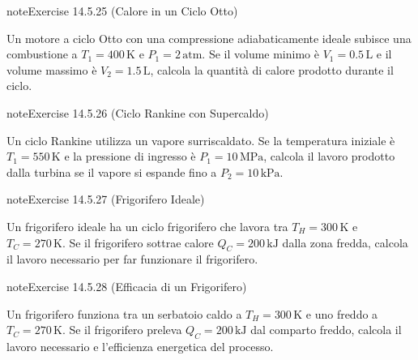 \documentclass[letterpaper,10pt,italian]{jupyterBook}
\begin{document}
\begin{sphinxadmonition}{note}{Exercise 14.5.25 (Calore in un Ciclo Otto)}



\sphinxAtStartPar
Un motore a ciclo Otto con una compressione adiabaticamente ideale subisce una combustione a \(T_1 = 400 \, \text{K}\) e \(P_1 = 2 \, \text{atm}\). Se il volume minimo è \(V_1 = 0.5 \, \text{L}\) e il volume massimo è \(V_2 = 1.5 \, \text{L}\), calcola la quantità di calore prodotto durante il ciclo.
\end{sphinxadmonition}
 \label{exercise:ch/thermodynamics/heat-engine-problems-exercise-25}

\begin{sphinxadmonition}{note}{Exercise 14.5.26 (Ciclo Rankine con Supercaldo)}



\sphinxAtStartPar
Un ciclo Rankine utilizza un vapore surriscaldato. Se la temperatura iniziale è \(T_1 = 550 \, \text{K}\) e la pressione di ingresso è \(P_1 = 10 \, \text{MPa}\), calcola il lavoro prodotto dalla turbina se il vapore si espande fino a \(P_2 = 10 \, \text{kPa}\).
\end{sphinxadmonition}
 \label{exercise:ch/thermodynamics/heat-engine-problems-exercise-26}

\begin{sphinxadmonition}{note}{Exercise 14.5.27 (Frigorifero Ideale)}



\sphinxAtStartPar
Un frigorifero ideale ha un ciclo frigorifero che lavora tra \(T_H = 300 \, \text{K}\) e \(T_C = 270 \, \text{K}\). Se il frigorifero sottrae calore \(Q_C = 200 \, \text{kJ}\) dalla zona fredda, calcola il lavoro necessario per far funzionare il frigorifero.
\end{sphinxadmonition}
 \label{exercise:ch/thermodynamics/heat-engine-problems-exercise-27}

\begin{sphinxadmonition}{note}{Exercise 14.5.28 (Efficacia di un Frigorifero)}



\sphinxAtStartPar
Un frigorifero funziona tra un serbatoio caldo a \(T_H = 300 \, \text{K}\) e uno freddo a \(T_C = 270 \, \text{K}\). Se il frigorifero preleva \(Q_C = 200 \, \text{kJ}\) dal comparto freddo, calcola il lavoro necessario e l’efficienza energetica del processo.
\end{sphinxadmonition}
 \label{exercise:ch/thermodynamics/heat-engine-problems-exercise-28}
\end{document}
